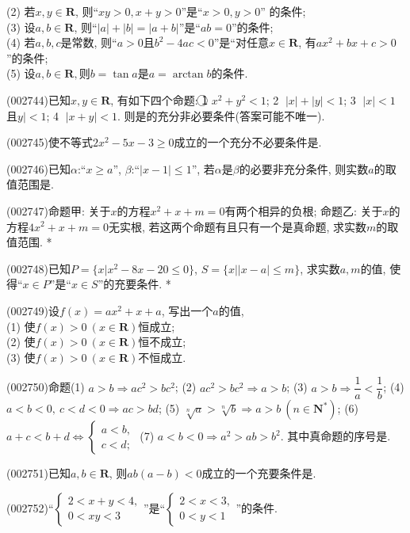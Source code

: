 (2) 若$x,y$$\in \mathbf{R}$, 则``$xy>0,x+y>0$''是``$x>0,y>0$'' 的条件;\\
(3) 设$a,b\in \mathbf{R}$, 则``$|a|+|b|=|a+b|$''是``$ab=0$''的条件;\\   
(4) 若$a,b,c$是常数, 则``$a>0$且$b^2-4ac<0$''是``对任意$x\in \mathbf{R}$, 有$ax^2+bx+c>0$''的条件;\\
(5) 设$a,b\in \mathbf{R},$则$b=\tan a$是$a=\arctan b$的条件.
\item (002744)已知$x,y\in \mathbf{R}$, 有如下四个命题: \textcircled{1} $x^2+y^2<1$; \textcircled{2} $|x|+|y|<1$; \textcircled{3} $|x|<1$且$y|<1$; \textcircled{4} $|x+y|<1$. 则是的充分非必要条件(答案可能不唯一).
\item (002745)使不等式$2x^2-5x-3\ge 0$成立的一个充分不必要条件是. 
\item (002746)已知$\alpha$:``$x\ge a$'', $\beta$:``$|x-1|\le 1$'', 若$\alpha$是$\beta$的必要非充分条件, 则实数$a$的取值范围是.
\item (002747)命题甲: 关于$x$的方程$x^2+x+m=0$有两个相异的负根; 命题乙: 关于$x$的方程$4x^2+x+m=0$无实根, 若这两个命题有且只有一个是真命题, 求实数$m$的取值范围.
*
\item (002748)已知$P=\{x|x^2-8x-20 \le 0\}$, $S=\{x||x-a|\le m\}$, 求实数$a,m$的值, 使得``$x\in P$''是``$x\in S$''的充要条件.
*
\item (002749)设$f(x)=ax^2+x+a$, 写出一个$a$的值,\\
(1) 使$f(x)>0\ (x\in \mathbf{R})$恒成立;\\
(2) 使$f(x)>0\ (x\in \mathbf{R})$恒不成立;\\
(3) 使$f(x)>0\ (x\in \mathbf{R})$不恒成立.
\item (002750)命题(1) $a>b\Rightarrow ac^2>bc^2$;   (2) $ac^2>bc^2\Rightarrow a>b$;     (3) $a>b\Rightarrow \dfrac 1a<\dfrac 1b$; (4) $a<b<0, \ c<d<0\Rightarrow ac>bd$;   (5) $\sqrt[n]a>\sqrt[n]b\Rightarrow a>b \ (n\in \mathbf{N}^*)$;    (6) $a+c<b+d\Leftrightarrow \begin{cases} a<b, \\ c<d; \end{cases}$ (7) $a<b<0\Rightarrow a^2>ab>b^2$. 其中真命题的序号是.
\item (002751)已知$a,b\in \mathbf{R}$, 则$ab(a-b)<0$成立的一个充要条件是.
\item (002752)``$\begin{cases} 2<x+y<4, \\ 0<xy<3 \end{cases}$''是``$\begin{cases} 2<x<3, \\ 0<y<1 \end{cases}$''的条件.
$$
